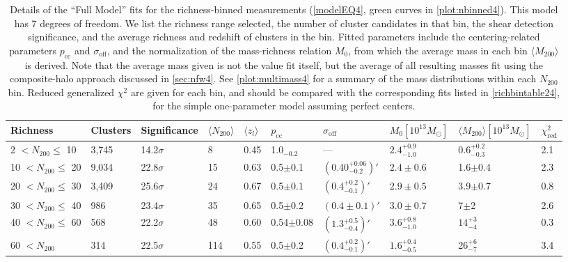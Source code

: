 \begin{landscape}

\begin{table}
\centering
    \caption[Shear Results for Richness-Binned Clusters (Full Model)]{Details of the ``Full Model'' fits for the richness-binned measurements (\autoref{modelEQ4}, green curves in \autoref{plot:nbinned4}). This model has 7 degrees of freedom. We list the richness range selected, the number of cluster candidates in that bin, the shear detection significance, and the average richness and redshift of clusters in the bin. Fitted parameters include the centering-related parameters $p_{\mathrm{cc}}$ and $\sigma_{\mathrm{off}}$, and the normalization of the mass-richness relation $M_0$, from which the average mass in each bin $\langle M_{200} \rangle$ is derived. Note that the average mass given is not the value fit itself, but the average of all resulting masses fit using the composite-halo approach discussed in \autoref{sec:nfw4}. See \autoref{plot:multimass4} for a summary of the mass distributions within each $N_{200}$ bin. Reduced generalized $\chi^2$ are given for each bin, and should be compared with the corresponding fits listed in \autoref{richbintable24}, for the simple one-parameter model assuming perfect centers.}
    \begin{tabular}{llllllllll}
      \hline
      Richness & Clusters & Significance & $\langle N_{200} \rangle$ & $\langle z_l \rangle$ & $p_{\mathrm{cc}}$ & $\sigma_{\mathrm{off}}$ & $M_0 \left[ 10^{13} M_{\odot}\right]$ & $\langle M_{200} \rangle \left[ 10^{13} M_{\odot}\right]$ & $\chi^2_{\mathrm{red}}$ \\ \hline
      2 $<N_{200}\leq$ 10 & 3,745 & 14.2$\sigma$ & 8 & 0.45 & 1.0$_{-0.2}$ & \---- & $2.4^{+0.9}_{-1.0}$ & $0.6^{+0.2}_{-0.3}$ & 2.1  \\
      10 $<N_{200}\leq$ 20 & 9,034 & 22.8$\sigma$ & 15 & 0.63 & 0.5$\pm$0.1 & $(0.40^{+0.06}_{-0.2})'$ & $2.4\pm0.6$ & 1.6$\pm$0.4 & 2.3 \\
      20 $<N_{200}\leq$ 30 & 3,409 & 25.6$\sigma$ & 24 & 0.67 & 0.5$\pm$0.1 & $(0.4^{+0.2}_{-0.1})'$ & $2.9\pm0.5$ & 3.9$\pm$0.7 & 0.8 \\
      30 $<N_{200}\leq$ 40 & 986 & 23.4$\sigma$ & 35 & 0.65 & 0.5$\pm$0.2 & $(0.4\pm0.1)'$ & $3.0\pm0.7$ & 7$\pm$2 & 2.6 \\
      40 $<N_{200}\leq$ 60 & 568 & 22.2$\sigma$ & 48 & 0.60 & 0.54$\pm$0.08 & $(1.3^{+0.5}_{-0.4})'$ & $3.6^{+0.8}_{-1.0}$ & $14^{+3}_{-4}$ & 0.3 \\
      60 $<N_{200}$ & 314 & 22.5$\sigma$ & 114 & 0.55 & 0.5$\pm$0.2 & $(0.4^{+0.2}_{-0.1})'$ & $1.6^{+0.4}_{-0.5}$ & 26$^{+6}_{-7}$ & 3.4 \\
      \hline
    \end{tabular}
\label{richbintable14}
\end{table}


\end{landscape}
